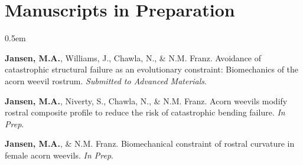 \documentclass[12pt,a4paper]{article}
\begin{document}
\section*{Manuscripts in Preparation}
	\begin{description}
		\itemsep0.5em
		\item \textbf{Jansen, M.A.}, Williams, J., Chawla, N., \& N.M. Franz. Avoidance of catastrophic structural failure as an evolutionary constraint: Biomechanics of the acorn weevil rostrum. \textit{Submitted to Advanced Materials}.
		\item \textbf{Jansen, M.A.}, Niverty, S., Chawla, N., \& N.M. Franz. Acorn weevils modify rostral composite profile to reduce the
		risk of catastrophic bending failure. \textit{In Prep}.
		\item \textbf{Jansen, M.A.}, \& N.M. Franz. Biomechanical constraint of rostral curvature in female acorn
		weevils. \textit{In Prep}.
	\end{description}
\end{document}
